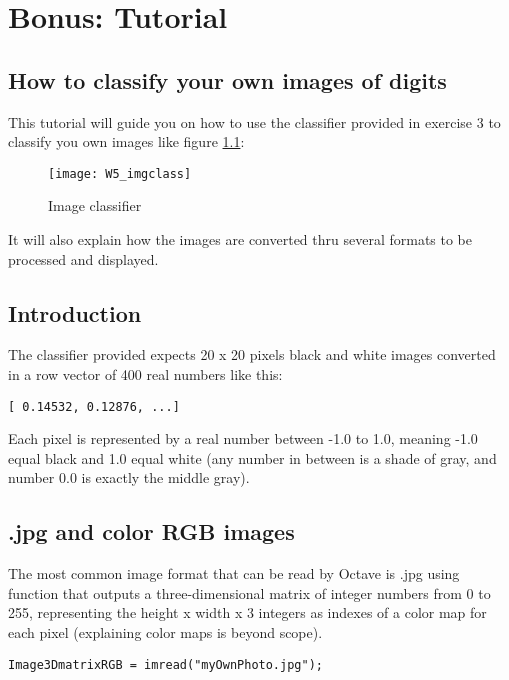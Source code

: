 \chapter{Bonus: Tutorial}
\section{How to classify your own images of digits}
This tutorial will guide you on how to use the classifier provided in exercise 3 to classify you own images like figure \ref{fig:w5_imgclass}:

\begin{figure}[ht]
\center
\texttt{[image: W5\_imgclass]}
\caption{Image classifier}
\label{fig:w5_imgclass}
\end{figure}
It will also explain how the images are converted thru several formats to be processed and displayed.
\section{Introduction}
The classifier provided expects 20 x 20 pixels black and white images converted in a row vector of 400 real numbers like this:
\begin{verbatim}
[ 0.14532, 0.12876, ...]
\end{verbatim}
Each pixel is represented by a real number between -1.0 to 1.0, meaning -1.0 equal black and 1.0 equal white (any number in between is a shade of gray, and number 0.0 is exactly the middle gray).
\section{.jpg and color RGB images}
The most common image format that can be read by Octave is .jpg using function that outputs a three-dimensional matrix of integer numbers from 0 to 255, representing the height x width x 3 integers as indexes of a color map for each pixel (explaining color maps is beyond scope).

\begin{verbatim}
Image3DmatrixRGB = imread("myOwnPhoto.jpg");
\end{verbatim}

